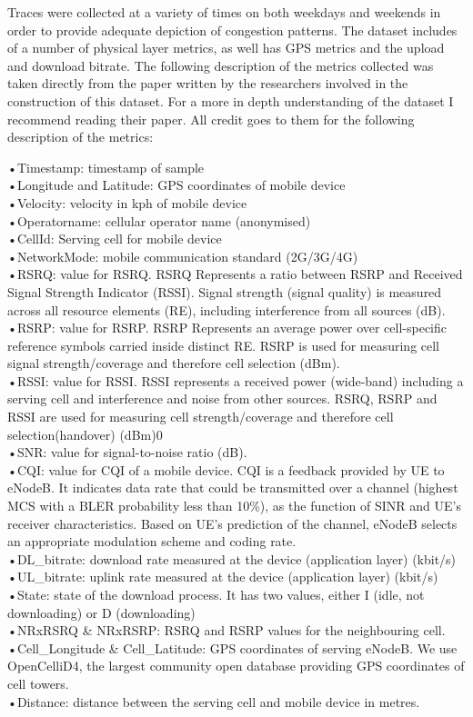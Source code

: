 Traces were collected at a variety of times on both weekdays and weekends in order to provide adequate depiction of congestion patterns. The dataset includes of a number of physical layer metrics, as well has GPS metrics and the upload and download bitrate. The following description of the metrics collected was taken directly from the paper \cite{inproceedings} written by the researchers involved in the construction of this dataset. For a more in depth understanding of the dataset I recommend reading their paper. All credit goes to them for the following description of the metrics:

•Timestamp: timestamp of sample \\
•Longitude and Latitude: GPS coordinates of mobile device \\
•Velocity: velocity in kph of mobile device \\ 
•Operatorname: cellular operator name (anonymised) \\
•CellId: Serving cell for mobile device \\
•NetworkMode: mobile communication standard (2G/3G/4G) \\
•RSRQ: value for RSRQ. RSRQ Represents a ratio between RSRP and Received Signal Strength Indicator (RSSI). Signal strength (signal quality) is measured across all resource elements (RE), including interference from all sources (dB). \\
•RSRP: value for RSRP. RSRP Represents an average power over cell-specific reference symbols carried inside distinct RE. RSRP is used for measuring cell signal strength/coverage and therefore cell selection (dBm). \\
•RSSI: value for RSSI. RSSI represents a received power (wide-band) including a serving cell and interference and noise from other sources. RSRQ, RSRP and RSSI are used for measuring cell strength/coverage and therefore cell selection(handover) (dBm)0\\
•SNR: value for signal-to-noise ratio (dB). \\
•CQI: value for CQI of a mobile device. CQI is a feedback provided by UE to eNodeB. It indicates data rate that could be transmitted over a channel (highest MCS with a BLER probability less than 10\%), as the function of SINR and UE’s receiver characteristics. Based on UE’s prediction of the channel, eNodeB selects an appropriate modulation scheme and coding rate. \\
•DL\_bitrate: download rate measured at the device (application layer) (kbit/s) \\
•UL\_bitrate: uplink rate measured at the device (application layer) (kbit/s) \\
•State: state of the download process. It has two values, either I (idle, not downloading) or D (downloading) \\
•NRxRSRQ \& NRxRSRP: RSRQ and RSRP values for the neighbouring cell. \\
•Cell\_Longitude \& Cell\_Latitude: GPS coordinates of serving eNodeB. We use OpenCelliD4, the largest community open database providing GPS coordinates of cell towers. \\
•Distance: distance between the serving cell and mobile device in metres.

